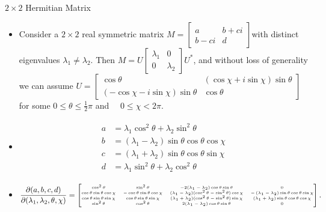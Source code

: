 \documentclass[UTF8,AutoFakeBold,AutoFakeSlant]{beamer}
\begin{document}
\begin{frame}{$2\times 2$ Hermitian Matrix}
    \begin{itemize}
        \scriptsize
        \item Consider a $2\times 2$ real symmetric matrix $M=\begin{bmatrix}a & b+ci \\b-ci & d\end{bmatrix}$with distinct eigenvalues $\lambda_1\neq\lambda_2$. Then $M=U\begin{bmatrix}\lambda_1&0\\0&\lambda_2\end{bmatrix}U^*$, and without loss of generality we can assume $U=\begin{bmatrix}\cos\theta & \left(\cos\chi+i\sin\chi\right)\sin\theta\\ \left(-\cos\chi-i\sin\chi\right)\sin\theta & \cos\theta\end{bmatrix}$ for some $0\leq\theta\leq\frac12\pi$ and $\quad0\leq\chi<2\pi$.
        \item \begin{align*}
                  \begin{split}
                      a & =\lambda_1\cos^2\theta+\lambda_2\sin^2\theta                  \\
                      b & =\left(\lambda_1-\lambda_2\right)\sin\theta\cos\theta\cos\chi \\
                      c & =\left(\lambda_1+\lambda_2\right)\sin\theta\cos\theta\sin\chi \\
                      d & =\lambda_{1}\sin^{2}\theta+\lambda_{2}\cos^{2}\theta
                  \end{split}
              \end{align*}
        \item
              \begin{align*}
                  \tiny
                  \frac{\partial(a,b,c,d)}{\partial(\lambda_1,\lambda_2,\theta,\chi)}=\begin{bmatrix}\cos^2\theta & \sin^2\theta & -2(\lambda_1-\lambda_2)\cos\theta\sin\theta & 0\\ \cos\theta\sin\theta\cos\chi & -\cos\theta\sin\theta\cos\chi & (\lambda_1-\lambda_2)(\cos^2\theta-\sin^2\theta)\cos\chi & -\left(\lambda_1-\lambda_2\right)\sin\theta\cos\theta\sin\chi \\ \cos\theta\sin\theta\sin\chi & \cos\theta\sin\theta\sin\chi & (\lambda_1+\lambda_2)(\cos^2\theta-\sin^2\theta)\sin\chi & \left(\lambda_1+\lambda_2\right)\sin\theta\cos\theta\cos\chi \\ \sin^2\theta & \cos^2\theta & 2(\lambda_1-\lambda_2)\cos\theta\sin\theta & 0\end{bmatrix}.
              \end{align*}
    \end{itemize}
\end{frame}
\end{document}
